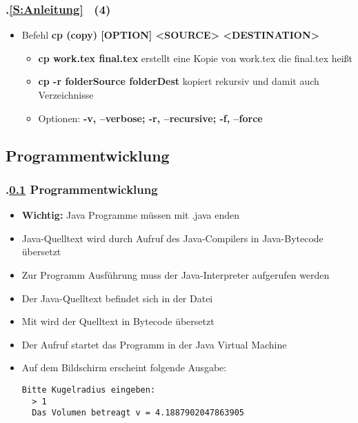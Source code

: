 \begin{frame}[t]%
\frametitle{\kap.\ref{S:Anleitung} \stitle\ (4)}%

\begin{itemize}
  \setlength{\itemsep}{4pt}
  \item Befehl \textbf{cp (copy) [OPTION] <SOURCE> <DESTINATION>}
  \begin{itemize}
    \setlength{\itemsep}{2pt}
    \item \textbf{cp work.tex final.tex} erstellt eine Kopie von work.tex die final.tex hei\ss t
    \item \textbf{cp -r folderSource folderDest} kopiert rekursiv und damit auch Verzeichnisse
    \item Optionen: \textbf{-v, --verbose; -r, --recursive; -f, --force}
  \end{itemize}
\end{itemize}
\end{frame}


\def\stitle{Programmentwicklung}%
\subsection{\stitle}\label{S:Progentw}
\begin{frame}[fragile]%
\frametitle{\kap.\ref{S:Progentw} \stitle}%

\begin{itemize}
  \item \textbf{Wichtig:} Java Programme m\"ussen mit .java enden
  \item Java-Quelltext wird durch Aufruf des Java-Compilers in Java-Bytecode übersetzt 
  \item Zur Programm Ausf\"uhrung muss der Java-Interpreter aufgerufen werden 
\end{itemize}

\begin{itemize}
  \item Der Java-Quelltext befindet sich in der Datei 
  \item Mit  wird der Quelltext in Bytecode übersetzt
  \item Der Aufruf  startet das Programm in der Java Virtual Machine
  \item Auf dem Bildschirm erscheint folgende Ausgabe:
  \begin{lstlisting}[style=bash]
  Bitte Kugelradius eingeben:
  > 1
  Das Volumen betreagt v = 4.1887902047863905
  \end{lstlisting}
\end{itemize}
\end{frame}
